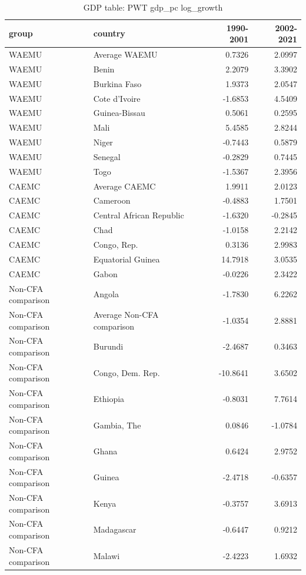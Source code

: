\begin{table}

\caption{GDP table: PWT gdp_pc log_growth}
\centering
\begin{tabular}[t]{llrr}
\toprule
group & country & 1990-2001 & 2002-2021\\
\midrule
WAEMU & Average WAEMU & 0.7326 & 2.0997\\
WAEMU & Benin & 2.2079 & 3.3902\\
WAEMU & Burkina Faso & 1.9373 & 2.0547\\
WAEMU & Cote d'Ivoire & -1.6853 & 4.5409\\
WAEMU & Guinea-Bissau & 0.5061 & 0.2595\\
\addlinespace
WAEMU & Mali & 5.4585 & 2.8244\\
WAEMU & Niger & -0.7443 & 0.5879\\
WAEMU & Senegal & -0.2829 & 0.7445\\
WAEMU & Togo & -1.5367 & 2.3956\\
CAEMC & Average CAEMC & 1.9911 & 2.0123\\
\addlinespace
CAEMC & Cameroon & -0.4883 & 1.7501\\
CAEMC & Central African Republic & -1.6320 & -0.2845\\
CAEMC & Chad & -1.0158 & 2.2142\\
CAEMC & Congo, Rep. & 0.3136 & 2.9983\\
CAEMC & Equatorial Guinea & 14.7918 & 3.0535\\
\addlinespace
CAEMC & Gabon & -0.0226 & 2.3422\\
Non-CFA comparison & Angola & -1.7830 & 6.2262\\
Non-CFA comparison & Average Non-CFA comparison & -1.0354 & 2.8881\\
Non-CFA comparison & Burundi & -2.4687 & 0.3463\\
Non-CFA comparison & Congo, Dem. Rep. & -10.8641 & 3.6502\\
\addlinespace
Non-CFA comparison & Ethiopia & -0.8031 & 7.7614\\
Non-CFA comparison & Gambia, The & 0.0846 & -1.0784\\
Non-CFA comparison & Ghana & 0.6424 & 2.9752\\
Non-CFA comparison & Guinea & -2.4718 & -0.6357\\
Non-CFA comparison & Kenya & -0.3757 & 3.6913\\
\addlinespace
Non-CFA comparison & Madagascar & -0.6447 & 0.9212\\
Non-CFA comparison & Malawi & -2.4223 & 1.6932\\

\end{tabular}
\end{table}
